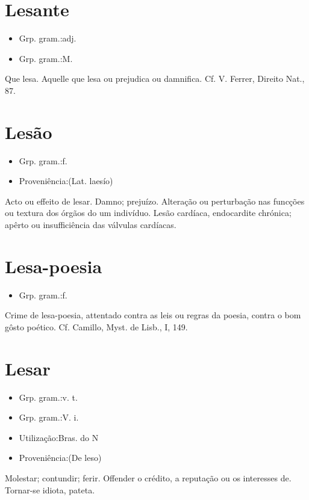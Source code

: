 \section{Lesante}
\begin{itemize}
\item {Grp. gram.:adj.}
\end{itemize}
\begin{itemize}
\item {Grp. gram.:M.}
\end{itemize}
Que lesa.
Aquelle que lesa ou prejudica ou damnifica. Cf. V. Ferrer, \textunderscore Direito Nat.\textunderscore , 87.
\section{Lesão}
\begin{itemize}
\item {Grp. gram.:f.}
\end{itemize}
\begin{itemize}
\item {Proveniência:(Lat. \textunderscore laesío\textunderscore )}
\end{itemize}
Acto ou effeito de lesar.
Damno; prejuízo.
Alteração ou perturbação nas funcções ou textura dos órgãos do um indivíduo.
\textunderscore Lesão cardíaca\textunderscore , endocardite chrónica; apêrto ou insufficiência das válvulas cardíacas.
\section{Lesa-poesia}
\begin{itemize}
\item {Grp. gram.:f.}
\end{itemize}
\textunderscore Crime de lesa-poesia\textunderscore , attentado contra as leis ou regras da poesia, contra o bom gôsto poético. Cf. Camillo, \textunderscore Myst. de Lisb.\textunderscore , I, 149.
\section{Lesar}
\begin{itemize}
\item {Grp. gram.:v. t.}
\end{itemize}
\begin{itemize}
\item {Grp. gram.:V. i.}
\end{itemize}
\begin{itemize}
\item {Utilização:Bras. do N}
\end{itemize}
\begin{itemize}
\item {Proveniência:(De \textunderscore leso\textunderscore )}
\end{itemize}
Molestar; contundir; ferir.
Offender o crédito, a reputação ou os interesses de.
Tornar-se idiota, pateta.
